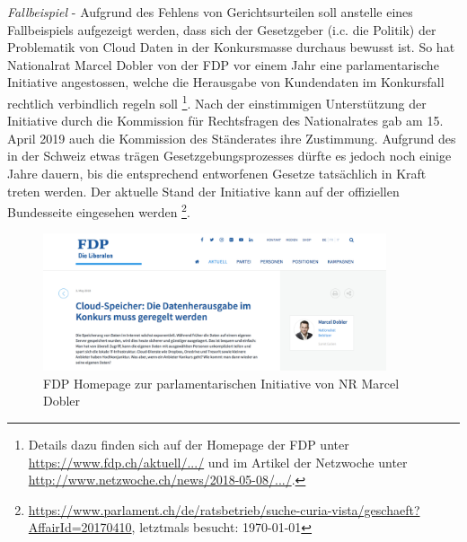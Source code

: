 \documentclass[a4paper,pointlessnumbers]{scrreprt}
\begin{document}
\textit{Fallbeispiel} - Aufgrund des Fehlens von Gerichtsurteilen soll anstelle eines Fallbeispiels aufgezeigt werden, dass sich der Gesetzgeber (i.c. die Politik) der Problematik von Cloud Daten in der Konkursmasse durchaus bewusst ist. So hat Nationalrat Marcel Dobler von der FDP vor einem Jahr eine parlamentarische Initiative angestossen, welche die Herausgabe von Kundendaten im Konkursfall rechtlich verbindlich regeln soll \footnote{Details dazu finden sich auf der Homepage der FDP unter \href{https://www.fdp.ch/aktuell/blog/blog-detail/news/cloud-speicher-die-datenherausgabe-im-konkurs-muss-geregelt-werden/}{https://www.fdp.ch/aktuell/.../} und im Artikel der Netzwoche unter \href{http://www.netzwoche.ch/news/2018-05-08/daten-sollen-nach-provider-konkurs-herausgegeben-werden}{http://www.netzwoche.ch/news/2018-05-08/.../}.}. Nach der einstimmigen Unterstützung der Initiative durch die Kommission für Rechtsfragen des Nationalrates gab am 15. April 2019 auch die Kommission des Ständerates ihre Zustimmung. Aufgrund des in der Schweiz etwas trägen Gesetzgebungsprozesses dürfte es jedoch noch einige Jahre dauern, bis die entsprechend entworfenen Gesetze tatsächlich in Kraft treten werden. Der aktuelle Stand der Initiative kann auf der offiziellen Bundesseite eingesehen werden \footnote{\href{https://www.parlament.ch/de/ratsbetrieb/suche-curia-vista/geschaeft?AffairId=20170410}{https://www.parlament.ch/de/ratsbetrieb/suche-curia-vista/geschaeft?AffairId=20170410}, letztmals besucht: \today}.

\begin{figure}[H]
\begin{center}
\includegraphics[width=0.9\textwidth]{images/fdpralinit.pdf}
\caption{FDP Homepage zur parlamentarischen Initiative von NR Marcel Dobler}
\end{center}
\end{figure}

\pagebreak
\end{document}
